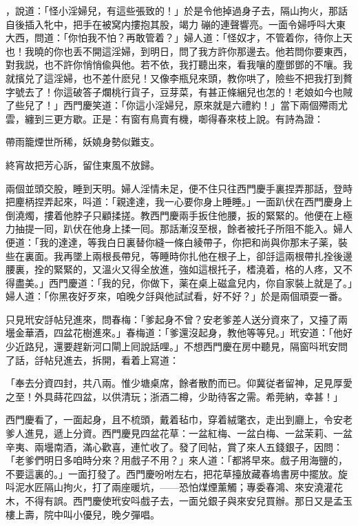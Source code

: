 ，說道：「怪小淫婦兒，有這些張致的！」於是令他掉過身子去，隔山拘火，那話自後插入牝中，把手在被窝内摟抱其股，竭力𢵞磞的連聲響亮。一面令婦呼呌大東大西，問道：「你怕我不怕？再敢管着？」婦人道：「怪奴才，不管着你，待你上天也！我曉的你也丢不開這淫婦，到明日，問了我方許你那邊去。他若問你要東西，對我説，也不許你悄悄偸與他。若不依，我打聽出來，看我嚷的塵鄧鄧的不嚷。我就擯兑了這淫婦，也不差什麽兒！又像李瓶兒來頭，教你哄了，險些不把我打到贅字號去了！你這破答子爛桃行貨子，豆芽菜，有甚正條綑兒也怎的！老娘如今也賊了些兒了！」西門慶笑道：「你這小淫婦兒，原來就是六禮約！」當下兩個殢雨尤雲，纏到三更方歇。正是：有窗有鳥賣有機，啣得春來枝上說。有詩為證：

\begin{myquote}
帶雨籠煙世所稀，妖嬈身勢似難支。

終宵故把芳心訴，留住東風不放歸。
\end{myquote}

兩個並頭交股，睡到天明。婦人淫情未足，便不住只往西門慶手裏捏弄那話，登時把麈柄捏弄起來，呌道：「親達達，我一心要你身上睡睡。」一面趴伏在西門慶身上倒澆燭，摟着他脖子只顧揉搓。教西門慶兩手扳住他腰，扳的緊緊的。他便在上極力抽提一囘，趴伏在他身上揉一囘。那話漸沒至根，餘者被托子所阻不能入。婦人便道：「我的達達，等我白日裏替你縫一條白綾帶子，你把和尚與你那末子薬，裝些在裏面。我再墜上兩根長帶兒，等睡時你扎他在根子上，卻㧱這兩根帶扎拴後邊腰裏，拴的緊緊的，又溫火又得全放進，強如這根托子，榰澆着，格的人疼，又不得盡美。」西門慶道：「我的兒，你做下，薬在桌上磁盒兒内，你自家裝上就是了。」婦人道：「你黑夜好歹來，咱晚夕㧱與他試試看，好不好？」於是兩個頑耍一番。

只見玳安㧱帖兒進來，問春梅：「爹起身不曾？安老爹差人送分資來了，又擡了兩壜金華酒，四盆花樹進來。」春梅道：「爹還沒起身，教他等等兒。」玳安道：「他好少近路兒，還要趕新河口閘上囘說話哩。」不想西門慶在房中聽見，隔窗呌玳安問了話，㧱帖兒進去，拆開，看着上寫道：

\begin{myquote}[\markfont]
「奉去分資四封，共八兩。惟少塘桌席，餘者散酌而已。仰冀従者留神，足見厚愛之至！外具蒔花四盆，以供清玩；浙酒二樽，少助待客之需。希莞納，幸甚！」
\end{myquote}

西門慶看了，一面起身，且不梳頭，戴着毡巾，穿着絨氅衣，走出到廳上，令安老爹人進見，遞上分資。西門慶見四盆花草：一盆紅梅、一盆白梅、一盆茉莉、一盆辛夷、兩壜南酒，滿心歡喜，連忙收了。發了囘帖，賞了來人五錢銀子，因問：「老爹們明日多咱時分來？用戲子不用？」來人道：「都將早來。戲子用海鹽的，不要這裏的。」一面打發了。西門慶吩咐左右，把花草擡放藏春塢書房中擺放。旋呌泥水匠隔山拘火，打了兩座暖坑，——恐怕煤煙薰觸；專委春鴻、來安澆灌花木，不得有誤。西門慶使玳安呌戲子去，一面兑銀子與來安兒買辦。那日又是孟玉樓上壽，院中叫小優兒，晚夕彈唱。

